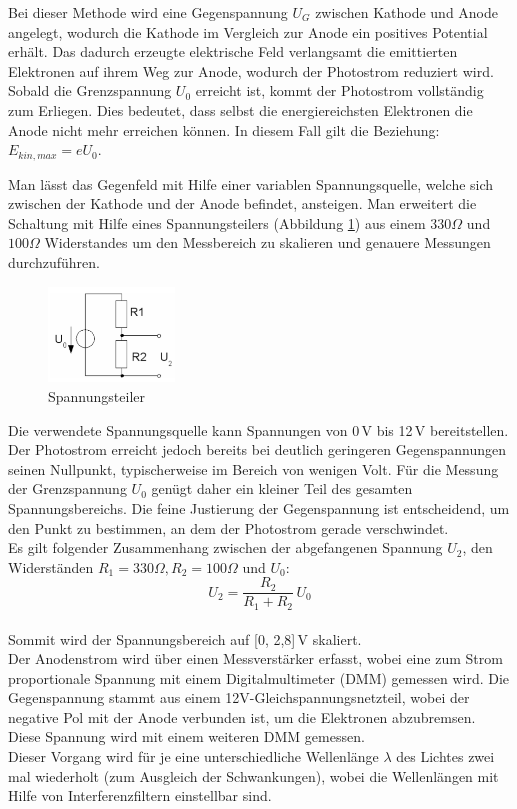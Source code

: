 Bei dieser Methode wird eine Gegenspannung $U_G$ zwischen Kathode und Anode angelegt, wodurch die Kathode im Vergleich zur Anode ein positives Potential erhält.
Das dadurch erzeugte elektrische Feld verlangsamt die emittierten Elektronen auf ihrem Weg zur Anode, wodurch der Photostrom reduziert wird. Sobald die Grenzspannung $U_0$ erreicht ist, kommt der Photostrom vollständig zum Erliegen. 
Dies bedeutet, dass selbst die energiereichsten Elektronen die Anode nicht mehr erreichen können. In diesem Fall gilt die Beziehung: 
$E_{kin,max} = eU_0$.

Man lässt das Gegenfeld mit Hilfe einer variablen Spannungsquelle, welche sich zwischen der Kathode und der Anode befindet, ansteigen.
Man erweitert die Schaltung mit Hilfe eines Spannungsteilers (Abbildung \ref{fig:spannungsteiler}) aus einem $330\Omega$ und $100\Omega$ Widerstandes um den Messbereich zu skalieren und genauere Messungen durchzuführen.
\begin{figure}[htbp]
    \centering
    \includegraphics[width=0.3\textwidth]{figs/Spannungsteiler.png}
    \caption{ Spannungsteiler \cite{Spannungsteiler}}
    \label{fig:spannungsteiler}
\end{figure}
\FloatBarrier
Die verwendete Spannungsquelle kann Spannungen von 0\,V bis 12\,V bereitstellen. 
Der Photostrom erreicht jedoch bereits bei deutlich geringeren Gegenspannungen seinen Nullpunkt, typischerweise im Bereich von wenigen Volt. 
Für die Messung der Grenzspannung $U_0$ genügt daher ein kleiner Teil des gesamten Spannungsbereichs. 
Die feine Justierung der Gegenspannung ist entscheidend, um den Punkt zu bestimmen, an dem der Photostrom gerade verschwindet.\\
Es gilt folgender Zusammenhang zwischen der abgefangenen Spannung $U_2$, den Widerständen $R_1 = 330 \Omega, R_2 = 100 \Omega$ und $U_0$:
\begin{equation}
  U_2 = \frac{R_2}{R_1 + R_2}\,U_0
\end{equation}\\
Sommit wird der Spannungsbereich auf [0, 2{,}8]\,V skaliert.\\

Der Anodenstrom wird über einen Messverstärker erfasst, 
wobei eine zum Strom proportionale Spannung mit einem 
Digitalmultimeter (DMM) gemessen wird. Die Gegenspannung 
stammt aus einem 12V-Gleichspannungsnetzteil, 
wobei der negative Pol mit der Anode verbunden ist, 
um die Elektronen abzubremsen. Diese Spannung wird 
mit einem weiteren DMM gemessen.\\
Dieser Vorgang wird für je eine unterschiedliche Wellenlänge
$\lambda$ des Lichtes zwei mal wiederholt (zum Ausgleich der Schwankungen), wobei die
Wellenlängen mit Hilfe von Interferenzfiltern
einstellbar sind.

